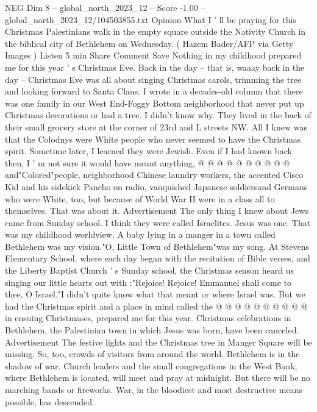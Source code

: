 \begin{textsample}{NEG Dim 8 – global\_north\_2023\_12 – Score -1.00 – global\_north\_2023\_12/104503855.txt}  \label{ex:f8_neg_344}
Opinion What I ' ll be praying for this Christmas Palestinians walk in the empty square outside the Nativity Church in the biblical city of Bethlehem on Wednesday. ( Hazem Bader/AFP via Getty Images ) Listen 5 min Share Comment Save Nothing in my childhood prepared me for this year ' s Christmas Eve.
Back in the day -- that is, waaay back in the day -- Christmas Eve was all about singing Christmas carols, trimming the tree and looking forward to Santa Claus.
I wrote in a decades-old column that there was one family in our West End-Foggy Bottom neighborhood that never put up Christmas decorations or had a tree.
I didn't know why.
They lived in the back of their small grocery store at the corner of 23rd and L streets NW.
All I knew was that the Colodnys were White people who never seemed to have the Christmas spirit.
Sometime later, I learned they were Jewish.
Even if I had known back then, I ' m not sure it would have meant anything, @ @ @ @ @ @ @ @ @ @ and"Colored"people, neighborhood Chinese laundry workers, the accented Cisco Kid and his sidekick Pancho on radio, vanquished Japanese soldiersand Germans who were White, too, but because of World War II were in a class all to themselves.
That was about it.
Advertisement The only thing I knew about Jews came from Sunday school.
I think they were called Israelites.
Jesus was one.
That was my childhood worldview.
A baby lying in a manger in a town called Bethlehem was my vision."O, Little Town of Bethlehem"was my song.
At Stevens Elementary School, where each day began with the recitation of Bible verses, and the Liberty Baptist Church ' s Sunday school, the Christmas season heard us singing our little hearts out with :"Rejoice!
Rejoice!
Emmanuel shall come to thee, O Israel."I didn't quite know what that meant or where Israel was.
But we had the Christmas spirit and a place in mind called the @ @ @ @ @ @ @ @ @ @ in ensuing Christmases, prepared me for this year.
Christmas celebrations in Bethlehem, the Palestinian town in which Jesus was born, have been canceled.
Advertisement The festive lights and the Christmas tree in Manger Square will be missing.
So, too, crowds of visitors from around the world.
Bethlehem is in the shadow of war.
Church leaders and the small congregations in the West Bank, where Bethlehem is located, will meet and pray at midnight.
But there will be no marching bands or fireworks.
War, in the bloodiest and most destructive means possible, has descended.

\end{textsample}
